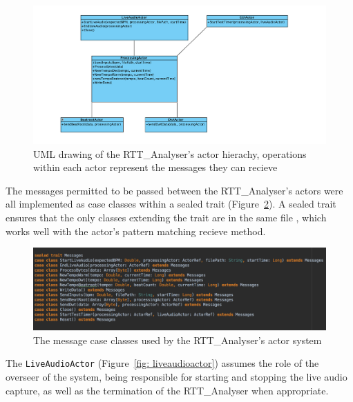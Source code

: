 \documentclass[a4paper, 11pt]{article}
\begin{document}
\begin{figure}[h]
\centering
\includegraphics[scale=0.25]{images/ActorHierachy.jpg}
\caption{UML drawing of the RTT\_Analyser's actor hierachy, operations within each actor represent the messages they can recieve}
\label{fig: actorHe}
\end{figure} 

The messages permitted to be passed between the RTT\_Analyser's actors were all implemented as case classes within a sealed trait (Figure~\ref{fig: messages}). A sealed trait ensures that the only classes extending the trait are in the same file \cite{odesky}, which works well with the actor's pattern matching recieve method.\par

\begin{figure}[h]
\centering
\includegraphics[scale=0.25]{images/messages.jpg}
\caption{The message case classes used by the RTT\_Analyser's actor system}
\label{fig: messages}
\end{figure} 

The \texttt{LiveAudioActor} (Figure~\ref{fig: liveaudioactor}) assumes the role of the overseer  of the system, being responsible for starting and stopping the live audio capture, as well as the termination of the RTT\_Analyser when appropriate. \par
\end{document}
